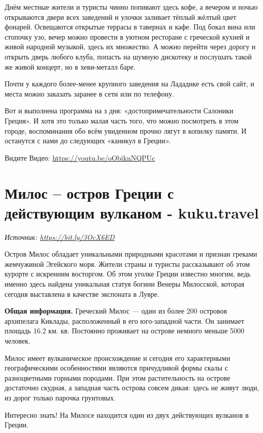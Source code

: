Днём местные жители и туристы чинно попивают здесь кофе, а вечером и ночью открываются двери всех заведений и улочки заливает тёплый жёлтый цвет фонарей. Освещаются открытые террасы в тавернах и кафе. Под бокал вина или стопочку узо, вечер можно провести в уютном ресторане с греческой кухней и живой народной музыкой, здесь их множество. А можно перейти через дорогу и открыть дверь любого клуба, попасть на шумную дискотеку и послушать такой же живой концерт, но в хеви-металл баре.

Почти у каждого более-менее крупного заведения на Лададике есть свой сайт, и места можно заказать заранее в сети или по телефону.

Вот и выполнена программа на з дня: «достопримечательности Салоники Греция». И хотя это только малая часть того, что можно посмотреть в этом городе, воспоминания обо всём увиденном прочно лягут в копилку памяти. И останутся с нами до следующих «каникул в Греции».

Видите Видео: \url{https://youtu.be/oObiknNQPUc}

\section{Милос – остров Греции с действующим вулканом - kuku.travel}

\textit{Источник: \url{https://bit.ly/3OcX6ED}}

Остров Милос обладает уникальными природными красотами и признан греками жемчужиной Эгейского моря. Жители страны и туристы рассказывают об этом курорте с искренним восторгом. Об этом уголке Греции известно многим, ведь именно здесь найдена уникальная статуя богини Венеры Милосской, которая сегодня выставлена в качестве экспоната в Лувре.

\textbf{Общая информация.}
Греческий Милос — один из более 200 островов архипелага Киклады, расположенный в его юго-западной части. Он занимает площадь 16.2 км. кв. Постоянно проживает на острове немного меньше 5000 человек.

Милос имеет вулканическое происхождение и сегодня его характерными географическими особенностями являются причудливой формы скалы с разноцветными горными породами. При этом растительность на острове достаточно скудная, а западная часть острова совсем дикая: здесь не живут люди, из дорог только парочка грунтовых.

\begin{fancyquotes}
    Интересно знать! На Милосе находится один из двух действующих вулканов в Греции.
\end{fancyquotes}

